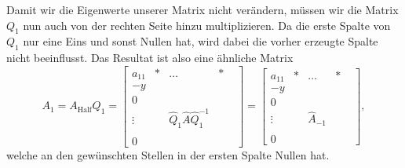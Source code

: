 Damit wir die Eigenwerte unserer Matrix nicht verändern, müssen wir die Matrix $Q_1$ nun auch von der rechten Seite hinzu multiplizieren.
Da die erste Spalte von $Q_1$ nur eine Eins und sonst Nullen hat, wird dabei die vorher erzeugte Spalte nicht beeinflusst.
Das Resultat ist also eine ähnliche Matrix
\begin{equation}
	A_{1}=A_{\text{Half}}Q_{1}=
	\begin{bmatrix}
	a_{11} & * & \dots & *\\
	-y & \\
	0 & & & &\\
	\vdots & &\hat{Q}_1\hat{A}\hat{Q}_1^{-1} &\\
	 & & & &\\
	0 & & & &
	\end{bmatrix}
	=
	\begin{bmatrix}
	a_{11} & * & \dots & *\\
	-y & \\
	0 & & & &\\
	\vdots & &\hat{A}_{-1} &\\
	 & & & &\\
	0 & & & &
	\end{bmatrix},
\end{equation}	
welche an den gewünschten Stellen in der ersten Spalte Nullen hat.

